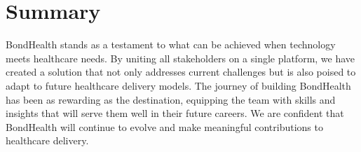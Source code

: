 \section*{Summary}
BondHealth stands as a testament to what can be achieved when technology meets healthcare needs. By uniting all stakeholders on a single platform, we have created a solution that not only addresses current challenges but is also poised to adapt to future healthcare delivery models. The journey of building BondHealth has been as rewarding as the destination, equipping the team with skills and insights that will serve them well in their future careers. We are confident that BondHealth will continue to evolve and make meaningful contributions to healthcare delivery.
